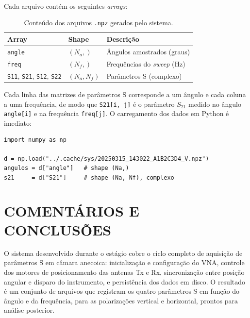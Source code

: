 \documentclass[12pt, a4paper]{article}
\begin{document}
Cada arquivo contém os seguintes \textit{arrays}:

\begin{table}[h]
\centering
\begin{tabular}{lll}
\toprule
\textbf{Array} & \textbf{Shape} & \textbf{Descrição} \\
\midrule
\texttt{angle} & $(N_a,)$ & Ângulos amostrados (graus) \\
\texttt{freq}  & $(N_f,)$ & Frequências do \textit{sweep} (Hz) \\
\texttt{S11}, \texttt{S21}, \texttt{S12}, \texttt{S22} & $(N_a, N_f)$ & Parâmetros S (complexo) \\
\bottomrule
\end{tabular}
\caption{Conteúdo dos arquivos \texttt{.npz} gerados pelo sistema.}
\label{tab:npz}
\end{table}

Cada linha das matrizes de parâmetros S corresponde a um ângulo e cada coluna a uma frequência, de modo que \texttt{S21[i, j]} é o parâmetro $S_{21}$ medido no ângulo \texttt{angle[i]} e na frequência \texttt{freq[j]}. O carregamento dos dados em Python é imediato:

\begin{lstlisting}[style=python, caption={Carregamento dos dados gerados.}]
import numpy as np

d = np.load("../.cache/sys/20250315_143022_A1B2C3D4_V.npz")
angulos = d["angle"]   # shape (Na,)
s21     = d["S21"]     # shape (Na, Nf), complexo
\end{lstlisting}

\section{COMENTÁRIOS E CONCLUSÕES}

O sistema desenvolvido durante o estágio cobre o ciclo completo de aquisição de parâmetros S em câmara anecoica: inicialização e configuração do VNA, controle dos motores de posicionamento das antenas Tx e Rx, sincronização entre posição angular e disparo do instrumento, e persistência dos dados em disco. O resultado é um conjunto de arquivos que registram os quatro parâmetros S em função do ângulo e da frequência, para as polarizações vertical e horizontal, prontos para análise posterior.
\end{document}
